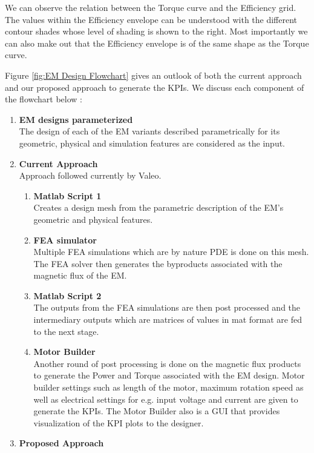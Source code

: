 \documentclass{report} %
\begin{document}
We can observe the relation between the Torque curve and the Efficiency grid. 
The values within the Efficiency envelope can be understood with the different contour shades whose level of shading is shown to the right.
Most importantly we can also make out that the Efficiency envelope is of the same shape as the Torque curve.

Figure \ref{fig:EM Design Flowchart} gives an outlook of both the current approach and our proposed approach to generate the \ac{KPI}s.
We discuss each component of the flowchart below :
\begin{enumerate}
    \item \textbf{\ac{EM} designs parameterized} \\
    The design of each of the \ac{EM} variants described parametrically for its geometric, physical and simulation features are considered as the input.
    \item \textbf{Current Approach}\\
    Approach followed currently by Valeo.
    \begin{enumerate}
        \item \textbf{Matlab Script 1} \\
        Creates a design mesh from the parametric description of the \ac{EM}'s geometric and physical features.
        \item \textbf{\ac{FEA} simulator} \\
        Multiple \ac{FEA} simulations which are by nature \ac{PDE} is done on this mesh. The \ac{FEA} solver then 
        generates the byproducts associated with the magnetic flux of the \ac{EM}.
        \item \textbf{Matlab Script 2} \\
        The outputs from the \ac{FEA} simulations are then post processed and the intermediary outputs which are matrices of values in mat format are fed to the next stage.
        \item \textbf{Motor Builder} \\
        Another round of post processing is done on the magnetic flux products to generate the Power and Torque associated with the \ac{EM} design.
        Motor builder settings such as length of the motor, maximum rotation speed as well as electrical settings for e.g. input voltage and current are given to 
        generate the \ac{KPI}s. The Motor Builder also is a GUI that provides visualization of the \ac{KPI} plots to the designer.
    \end{enumerate}
    \item \textbf{Proposed Approach}\\

\end{enumerate}
\end{document}
